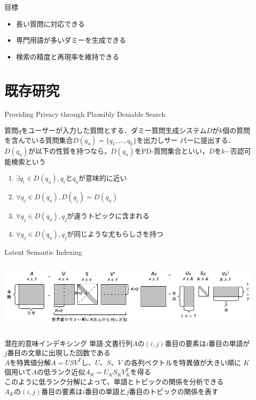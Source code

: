 \documentclass[14pt,xcolor=dvipsnames,table,dvipdfmx]{beamer}
\begin{document}
\begin{frame}{目標}
    \begin{block}{}
    \begin{itemize}
        \item 長い質問に対応できる
        \item 専門用語が多いダミーを生成できる
		\item 検索の精度と再現率を維持できる
    \end{itemize}
    \end{block}
\end{frame}

\section{既存研究}
\begin{frame}{Providing Privacy through Plausibly Deniable Search \cite{providing2009}}
	\begin{block}{}
	質問$q$をユーザーが入力した質問とする．ダミー質問生成システム$D$が$k$個の質問を含んでいる質問集合$D(q_u)=\{q_1, \dots , q_k\}$を出力しサー
	バーに提出する．$D(q_u)$が以下の性質を持つなら，$D(q_u)$をPD-質問集合といい，$D$を$k$−否認可能検索という
	\begin{enumerate}
	\item $\exists q_i \in D(q_u),q_i$と$q_u$が意味的に近い
	\item $\forall q_j \in D(q_u),D(q_j) = D(q_u)$
	\item $\forall q_j \in D(q_u),q_j$が違うトピックに含まれる
	\item $\forall q_j \in D(q_u),q_j$が同じような尤もらしさを持つ
	\end{enumerate}
	\end{block}
\end{frame}

\begin{frame}{Latent Semantic Indexing}
    \begin{columns}[c]
        \begin{column}{1.0\textwidth} %
            \includegraphics[width=\columnwidth]{photo11.png}
		\end{column}
    \end{columns}
	\begin{block}{潜在的意味インデキシング}
	\fontsize{12pt}{7.2}\selectfont
		単語$\cdot$文書行列$A$の$(i,j)$番目の要素は$i$番目の単語が$j$番目の文章に出現した回数である　\\
		$A$を特異値分解$A = USV^T$し、$U$、$S$、$V$	の各列ベクトルを特異値が大きい順に
		$K$個用いて$A$の低ランク近似$A_K=U_KS_KV_{K}^T$を得る \\
		このように低ランク分解によって、単語とトピックの関係を分析できる \\
		$A_K$の$(i,j)$番目の要素は$i$番目の単語と$j$番目のトピックの関係を表す
	\end{block}
\end{frame}
\end{document}
